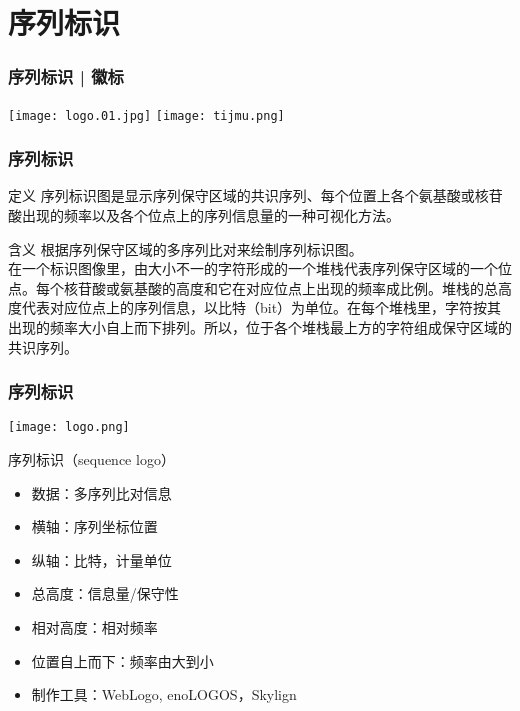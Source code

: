 \section{序列标识}
\begin{frame}
  \frametitle{序列标识 | 徽标}
  \begin{center}
    \texttt{[image: logo.01.jpg]}
    \qquad
    \texttt{[image: tijmu.png]}
  \end{center}
\end{frame}

\begin{frame}
  \frametitle{\alert{序列标识}}
  \begin{block}{定义}
序列标识图是显示序列保守区域的共识序列、每个位置上各个氨基酸或核苷酸出现的频率以及各个位点上的序列信息量的一种可视化方法。
  \end{block}
  \pause
  \begin{block}{含义}
    根据序列保守区域的多序列比对来绘制序列标识图。\\
    \vspace{0.5em}
在一个标识图像里，由大小不一的字符形成的一个堆栈代表序列保守区域的一个位点。每个核苷酸或氨基酸的高度和它在对应位点上出现的频率成比例。堆栈的总高度代表对应位点上的序列信息，以比特（bit）为单位。在每个堆栈里，字符按其出现的频率大小自上而下排列。所以，位于各个堆栈最上方的字符组成保守区域的共识序列。
  \end{block}
\end{frame}

\begin{frame}
  \frametitle{\alert{序列标识}}
  \begin{center}
    \texttt{[image: logo.png]}
  \end{center}
  \pause
  \begin{block}{序列标识（sequence logo）}
    \begin{itemize}
      \item 数据：多序列比对信息
      \item 横轴：序列坐标位置
      \item 纵轴：比特，计量单位
      \item 总高度：信息量/保守性
      \item 相对高度：相对频率
      \item 位置自上而下：频率由大到小
      \item 制作工具：WebLogo, enoLOGOS，Skylign
    \end{itemize}
  \end{block}
\end{frame}

